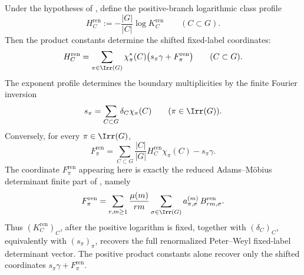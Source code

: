 \begin{corollary}
  \label{thm:renormalized-coordinate-readout}
  \label{cor:renormalized-coordinate-readout}
  \label{thm:class-product-determinant-rigidity}
  \label{prop:class-product-downstream-coordinate-status}
  \label{cor:class-product-hyperplane-stability}
  \label{cor:class-product-stability-scalar-independence}
  \label{prop:class-product-fixed-coordinate-equivalence}
  \label{thm:class-product-minimal-obstruction-skeleton}
  \label{cor:class-product-minimal-obstruction-skeleton}
  \label{cor:class-product-artin-obstruction-recovery}
  \label{cor:class-product-artin-obstruction-readout}
  \label{thm:main-iii-certificate-chain}
  \label{thm:adams-obstruction-class-product}
  \label{cor:adams-obstruction-bound}
  \label{cor:adams-obstruction-budget}
  \label{cor:class-product-constant-rigidity}
  \label{cor:class-euler-product-determinant-evaluation}
  \label{prop:classical-layer-adams-corrected-constant-separation}
  Under the hypotheses of
  , define the positive-branch
  logarithmic class profile
  \begin{equation}\label{eq:renormalized-coordinate-profile}
    H_C^{\mathrm{ren}}
    :=
    -\frac{|G|}{|C|}\log K_C^{\mathrm{ren}}
    \qquad(C\subset G).
  \end{equation}
  Then the product constants determine the shifted fixed-label coordinates:
  \begin{equation}\label{eq:renormalized-coordinate-forward}
    H_C^{\mathrm{ren}}
    =
    \sum_{\pi\in\Irr(G)}
      \chi_\pi^\ast(C)\bigl(s_\pi\gamma+F_\pi^{\mathrm{ren}}\bigr)
    \qquad(C\subset G).
  \end{equation}
  The exponent profile determines the boundary multiplicities by the
  finite Fourier inversion
  \begin{equation}\label{eq:renormalized-coordinate-s-inverse}
    s_\pi
    =
    \sum_{C\subset G}\delta_C\chi_\pi(C)
    \qquad(\pi\in\Irr(G)).
  \end{equation}
  Conversely, for every \(\pi\in\Irr(G)\),
  \begin{equation}\label{eq:renormalized-coordinate-inverse}
    F_\pi^{\mathrm{ren}}
    =
    \sum_{C\subset G}\frac{|C|}{|G|}
      H_C^{\mathrm{ren}}\chi_\pi(C)
    -s_\pi\gamma .
  \end{equation}
  The coordinate \(F_\pi^{\mathrm{ren}}\) appearing here is exactly the
  reduced Adams--M\"obius determinant finite part of
  , namely
  \[
    F_\pi^{\mathrm{ren}}
    =
    \sum_{r,m\ge1}\frac{\mu(m)}{rm}
      \sum_{\sigma\in\Irr(G)}
        a_{\pi,\sigma}^{(m)}\,
        B_{rm,\sigma}^{\mathrm{ren}}.
  \]
  Thus \((K_C^{\mathrm{ren}})_C\), after the positive logarithm is fixed,
  together with \((\delta_C)_C\), equivalently with \((s_\pi)_\pi\), recovers
  the full renormalized Peter--Weyl fixed-label determinant vector.  The
  positive product constants alone recover only the shifted coordinates
  \(s_\pi\gamma+F_\pi^{\mathrm{ren}}\).


\end{corollary}
